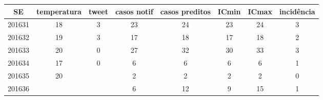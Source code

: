 \begin{tabular}{c|ccccccc}
  \hline
SE & temperatura & tweet & casos notif & casos preditos & ICmin & ICmax & incidência \\ 
  \hline
201631 & 18 & 3 & 23 & 24 & 23 & 24 & 3 \\ 
  201632 & 19 & 3 & 17 & 18 & 17 & 18 & 2 \\ 
  201633 & 20 & 0 & 27 & 32 & 30 & 33 & 3 \\ 
  201634 & 17 & 0 & 6 & 6 & 6 & 6 & 1 \\ 
  201635 & 20 &  & 2 & 2 & 2 & 2 & 0 \\ 
  201636 &  &  & 6 & 12 & 9 & 15 & 1 \\ 
   \hline
\end{tabular}
